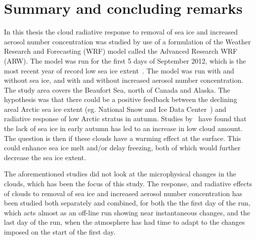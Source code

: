 \chapter{Summary and concluding remarks}
\label{chap:summaryconclusions}
In this thesis the cloud radiative response to removal of sea ice and increased aerosol number concentration was studied by use of a formulation of the Weather Research and Forecasting (WRF) model called the Advanced Research WRF (ARW). The model was run for the first 5 days of September 2012, which is the most recent year of record low sea ice extent~\citep{NSIDC}. The model was run with and without sea ice, and with and without increased aerosol number concentration. The study area covers the Beaufort Sea, north of Canada and Alaska. The hypothesis was that there could be a positive feedback between the declining areal Arctic sea ice extent (eg. National Snow and Ice Data Center~\citep{NSIDC}) and radiative response of low Arctic stratus in autumn. Studies by~\citet{Eastman2010a,Kay2009,Palm2010} have found that the lack of sea ice in early autumn has led to an increase in low cloud amount. The question is then if these clouds have a warming effect at the surface. This could enhance sea ice melt and/or delay freezing, both of which would further decrease the sea ice extent. 

The aforementioned studies did not look at the microphysical changes in the clouds, which has been the focus of this study. The response, and radiative effects of clouds to removal of sea ice and increased aerosol number concentration has been studied both separately and combined, for both the the first day of the run, which acts almost as an off-line run showing near instantaneous changes, and the last day of the run, when the atmosphere has had time to adapt to the changes imposed on the start of the first day.

